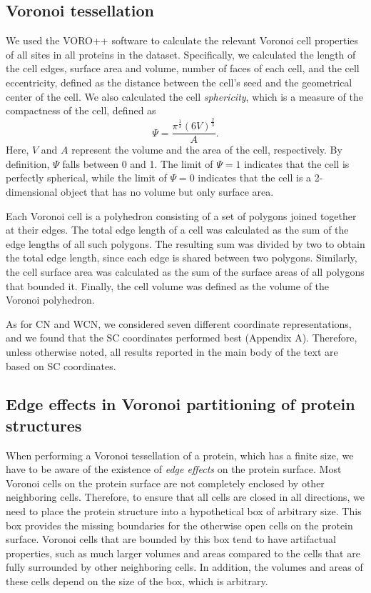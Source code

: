 \documentclass[12pt]{article}
\begin{document}
\subsection*{Voronoi tessellation}

We used the VORO++ software \cite{rycroft_voro++:_2009} to calculate the relevant Voronoi cell properties of all sites in all proteins in the dataset. Specifically, we calculated the length of the cell edges, surface area and volume, number of faces of each cell, and the cell eccentricity, defined as the distance between the cell's seed and the geometrical center of the cell. We also calculated the cell {\it sphericity}, which is a measure of the compactness of the cell, defined as
    \begin{equation}
        \label{eqn:sphericity}
        \Psi = \frac{\pi^{\frac{1}{3}}(6V)^{\frac{2}{3}}}{A}.
    \end{equation}
Here, $V$ and $A$ represent the volume and the area of the cell, respectively.  By definition, $\Psi$ falls between 0 and 1. The limit of $\Psi=1$ indicates that the cell is perfectly spherical, while the limit of $\Psi=0$ indicates that the cell is a 2-dimensional object that has no volume but only surface area.

Each Voronoi cell is a polyhedron consisting of a set of polygons joined together at their edges. The total edge length of a cell was calculated as the sum of the edge lengths of all such polygons. The resulting sum was divided by two to obtain the total edge length, since each edge is shared between two polygons. Similarly, the cell surface area was calculated as the sum of the surface areas of all polygons that bounded it. Finally, the cell volume was defined as the volume of the Voronoi polyhedron.

As for CN and WCN, we considered seven different coordinate representations, and we found that the SC coordinates performed best (Appendix A). Therefore, unless otherwise noted, all results reported in the main body of the text are based on SC coordinates.

\subsection*{Edge effects in Voronoi partitioning of protein structures}

When performing a Voronoi tessellation of a protein, which has a finite size, we have to be aware of the existence of {\it edge effects} on the protein surface. Most Voronoi cells on the protein surface are not completely enclosed by other neighboring cells. Therefore, to ensure that all cells are closed in all directions, we need to place the protein structure into a hypothetical box of arbitrary size. This box provides the missing boundaries for the otherwise open cells on the protein surface. Voronoi cells that are bounded by this box tend to have artifactual properties, such as much larger volumes and areas compared to the cells that are fully surrounded by other neighboring cells. In addition, the volumes and areas of these cells depend on the size of the box, which is arbitrary.
\end{document}

